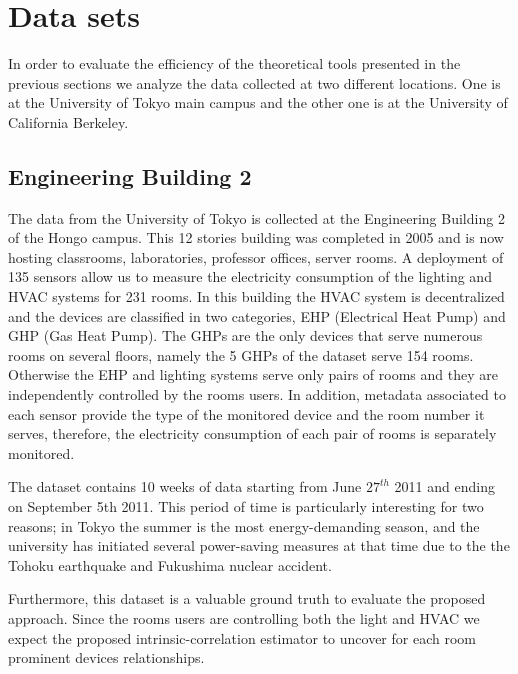 \section{Data sets}
In order to evaluate the efficiency of the theoretical tools presented in the previous sections we analyze the data collected at two different locations.
One is at the University of Tokyo main campus and the other one is at the University of California Berkeley.

\subsection{Engineering Building 2} \label{data:engbldg2}
The data from the University of Tokyo is collected at the Engineering Building 2 of the Hongo campus. 
This 12 stories building was completed in 2005 and is now hosting classrooms, laboratories, professor offices, server rooms.
A deployment of 135 sensors allow us to measure the electricity consumption of the lighting and HVAC systems for 231 rooms.
In this building the HVAC system is decentralized and the devices are classified in two categories, EHP (Electrical Heat Pump) and GHP (Gas Heat Pump).
The GHPs are the only devices that serve numerous rooms on several floors, namely the 5 GHPs of the dataset serve 154 rooms.
Otherwise the EHP and lighting systems serve only pairs of rooms and they are independently controlled by the rooms users.
In addition, metadata associated to each sensor provide the type of the monitored device and the room number it serves, therefore, the electricity consumption of each pair of rooms is separately monitored.

The dataset contains 10 weeks of data starting from June $27^{th}$ 2011 and ending on September 5th 2011.
This period of time is particularly interesting for two reasons; in Tokyo the summer is the most energy-demanding season, and the university has initiated several power-saving measures at that time due to the the Tohoku earthquake and Fukushima nuclear accident.

Furthermore, this dataset is a valuable ground truth to evaluate the proposed approach.
Since the rooms users are controlling both the light and HVAC we expect the proposed intrinsic-correlation estimator to uncover for each room prominent devices relationships.

